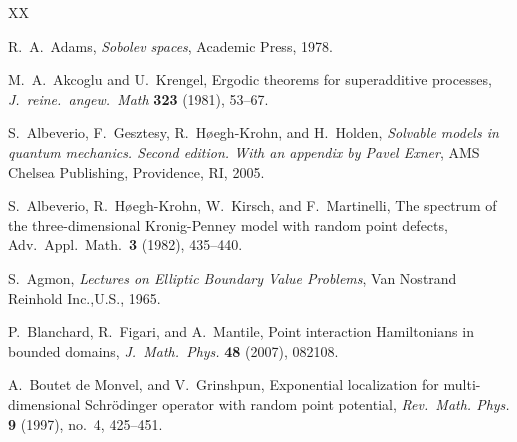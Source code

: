 \documentclass[12pt,a4paper]{article}
\begin{document}
\begin{thebibliography}{XX}



R.\ A.\ Adams,
\textit{Sobolev spaces},
Academic Press,
1978.

M.\ A.\ Akcoglu and U.\ Krengel,
Ergodic theorems for superadditive processes,
\textit{J.\ reine.\ angew.\ Math} \textbf{323} (1981),
53--67.

S.\ Albeverio, F.\ Gesztesy, R.\ H{\o}egh-Krohn, and H.\ Holden,
\textit{Solvable models in quantum mechanics. 
Second edition. With an appendix by Pavel Exner},
AMS Chelsea Publishing, Providence, RI, 2005.

S.\ Albeverio, R.\ H{\o}egh-Krohn, 
W.\ Kirsch, and F.\ Martinelli,
The spectrum of the three-dimensional
Kronig-Penney model with random point defects,
Adv.\ Appl.\ Math.\ \textbf{3} (1982), 435--440.

S.\ Agmon,
\textit{Lectures on Elliptic Boundary Value Problems},
Van Nostrand Reinhold Inc.,U.S., 1965.






P.\ Blanchard, R.\ Figari, and A.\ Mantile,
Point interaction Hamiltonians in bounded domains,
\textit{J.\ Math.\ Phys.} \textbf{48} (2007),
082108.




A.\ Boutet de Monvel, and V.\ Grinshpun,
Exponential localization for multi-dimensional Schr\"odinger operator
with random point potential,
\textit{Rev.\ Math. Phys.} \textbf{9} (1997), no.\ 4, 425--451.



\end{thebibliography}
\end{document}
